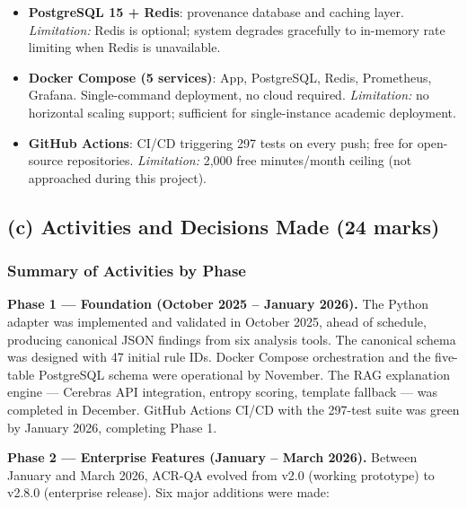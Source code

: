 \documentclass[12pt,a4paper]{article}
\begin{document}
\begin{itemize}[leftmargin=1.5em]
  \item \textbf{PostgreSQL 15 + Redis}: provenance database and caching layer.
  \emph{Limitation:} Redis is optional; system degrades gracefully to in-memory
  rate limiting when Redis is unavailable.

  \item \textbf{Docker Compose (5 services)}: App, PostgreSQL, Redis, Prometheus,
  Grafana.  Single-command deployment, no cloud required.  \emph{Limitation:} no
  horizontal scaling support; sufficient for single-instance academic deployment.

  \item \textbf{GitHub Actions}: CI/CD triggering 297 tests on every push; free for
  open-source repositories.  \emph{Limitation:} 2,000 free minutes/month ceiling
  (not approached during this project).
\end{itemize}

\subsection{(c) Activities and Decisions Made (24 marks)}

\subsubsection{Summary of Activities by Phase}

\textbf{Phase 1 --- Foundation (October 2025 -- January 2026).}
The Python adapter was implemented and validated in October 2025, ahead of schedule,
producing canonical JSON findings from six analysis tools.  The canonical schema was
designed with 47 initial rule IDs.  Docker Compose orchestration and the five-table
PostgreSQL schema were operational by November.  The RAG explanation engine ---
Cerebras API integration, entropy scoring, template fallback --- was completed in
December.  GitHub Actions CI/CD with the 297-test suite was green by January 2026,
completing Phase 1.

\textbf{Phase 2 --- Enterprise Features (January -- March 2026).}
Between January and March 2026, ACR-QA evolved from v2.0 (working prototype) to
v2.8.0 (enterprise release).  Six major additions were made:
\end{document}
